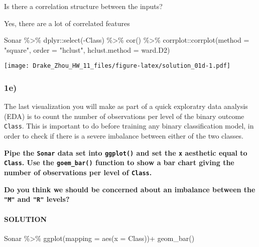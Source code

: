 \documentclass[
]{article}
\newenvironment{Shaded}{\begin{snugshade}}{\end{snugshade}}
\newcommand{\AttributeTok}[1]{\textcolor[rgb]{0.77,0.63,0.00}{#1}}
\newcommand{\FunctionTok}[1]{\textcolor[rgb]{0.00,0.00,0.00}{#1}}
\newcommand{\NormalTok}[1]{#1}
\newcommand{\SpecialCharTok}[1]{\textcolor[rgb]{0.00,0.00,0.00}{#1}}
\newcommand{\StringTok}[1]{\textcolor[rgb]{0.31,0.60,0.02}{#1}}
\begin{document}
Is there a correlation structure between the inputs?

Yes, there are a lot of correlated features

\begin{Shaded}
\begin{Highlighting}[]
\NormalTok{Sonar }\SpecialCharTok{\%\textgreater{}\%}
\NormalTok{  dplyr}\SpecialCharTok{::}\FunctionTok{select}\NormalTok{(}\SpecialCharTok{{-}}\NormalTok{Class) }\SpecialCharTok{\%\textgreater{}\%}
  \FunctionTok{cor}\NormalTok{() }\SpecialCharTok{\%\textgreater{}\%}
\NormalTok{  corrplot}\SpecialCharTok{::}\FunctionTok{corrplot}\NormalTok{(}\AttributeTok{method =} \StringTok{"square"}\NormalTok{, }\AttributeTok{order =} \StringTok{"hclust"}\NormalTok{, }\AttributeTok{hclust.method =} \StringTok{\textquotesingle{}ward.D2\textquotesingle{}}\NormalTok{)}
\end{Highlighting}
\end{Shaded}

\texttt{[image: Drake\_Zhou\_HW\_11\_files/figure-latex/solution\_01d-1.pdf]}

\hypertarget{e}{%
\subsubsection{1e)}\label{e}}

The last visualization you will make as part of a quick exploratry data
analysis (EDA) is to count the number of observations per level of the
binary outcome \texttt{Class}. This is important to do before training
any binary classification model, in order to check if there is a severe
imbalance between either of the two classes.

\textbf{Pipe the \texttt{Sonar} data set into \texttt{ggplot()} and set
the \texttt{x} aesthetic equal to \texttt{Class}. Use the
\texttt{goem\_bar()} function to show a bar chart giving the number of
observations per level of \texttt{Class}.}

\textbf{Do you think we should be concerned about an imbalance between
the \texttt{"M"} and \texttt{"R"} levels?}

\hypertarget{solution-4}{%
\paragraph{SOLUTION}\label{solution-4}}

\begin{Shaded}
\begin{Highlighting}[]
\NormalTok{Sonar }\SpecialCharTok{\%\textgreater{}\%}
  \FunctionTok{ggplot}\NormalTok{(}\AttributeTok{mapping =} \FunctionTok{aes}\NormalTok{(}\AttributeTok{x =}\NormalTok{ Class))}\SpecialCharTok{+}
  \FunctionTok{geom\_bar}\NormalTok{()}
\end{Highlighting}
\end{Shaded}
\end{document}
